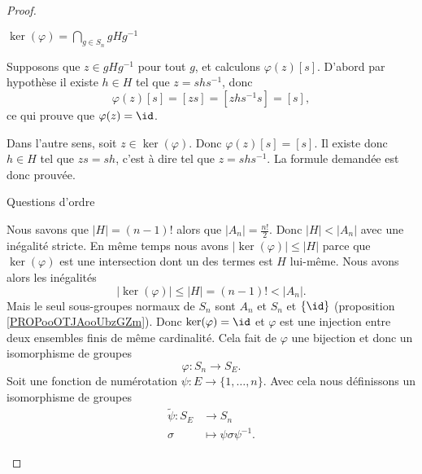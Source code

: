 \begin{proof}
\begin{subproof}
\begin{subproof}
                \item[\( \ker(\varphi)=\bigcap_{g\in S_n}gHg^{-1}\)]

                    Supposons que \( z\in gHg^{-1}\) pour tout \( g\), et calculons \( \varphi(z)[s]\). D'abord par hypothèse il existe \( h\in H\) tel que \( z=shs^{-1}\), donc
                    \begin{equation}
                        \varphi(z)[s]=[zs]=[zhs^{-1}s]=[s],
                    \end{equation}
                    ce qui prouve que \( \varphi(z)=\id\).

                    Dans l'autre sens, soit \( z\in\ker(\varphi)\). Donc \( \varphi(z)[s]=[s]\). Il existe donc \( h\in H\) tel que \( zs=sh\), c'est à dire tel que \( z=shs^{-1}\). La formule demandée est donc prouvée.

                \item[Questions d'ordre]

                    Nous savons que \( | H |=(n-1)!\) alors que \( | A_n |=\frac{ n! }{2}\). Donc \( | H |<| A_n |\) avec une inégalité stricte. En même temps nous avons \( | \ker(\varphi) |\leq | H |\) parce que \( \ker(\varphi)\) est une intersection dont un des termes est \( H\) lui-même. Nous avons alors les inégalités
                    \begin{equation}
                        | \ker(\varphi) |\leq | H |=(n-1)!<| A_n |.
                    \end{equation}
                    Mais le seul sous-groupes normaux de \( S_n\) sont \( A_n\) et \( S_n\) et \( \{ \id \}\) (proposition \ref{PROPooOTJAooUbzGZm}). Donc \( \ker(\varphi)=\id\) et \( \varphi\) est une injection entre deux ensembles finis de même cardinalité. Cela fait de \( \varphi\) une bijection et donc un isomorphisme de groupes
                    \begin{equation}
                        \varphi\colon S_n\to S_E.
                    \end{equation}
                    Soit une fonction de numérotation \( \psi\colon E\to \{ 1,\ldots, n \}\). Avec cela nous définissons un isomorphisme de groupes
                    \begin{equation}
                        \begin{aligned}
                            \tilde \psi\colon S_E&\to S_n \\
                            \sigma&\mapsto \psi\sigma\psi^{-1}. 
                        \end{aligned}
                    \end{equation}
                    

\end{subproof}
\end{subproof}
\end{proof}
